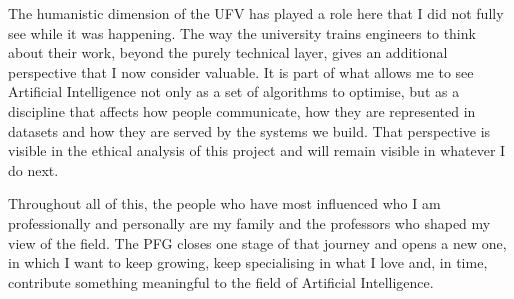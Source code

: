 The humanistic dimension of the UFV has played a role here that I did not fully see while it was
happening. The way the university trains engineers to think about their work, beyond the purely
technical layer, gives an additional perspective that I now consider valuable. It is part of what
allows me to see Artificial Intelligence not only as a set of algorithms to optimise, but as a
discipline that affects how people communicate, how they are represented in datasets and how they
are served by the systems we build. That perspective is visible in the ethical analysis of this
project and will remain visible in whatever I do next.

Throughout all of this, the people who have most influenced who I am professionally and personally
are my family and the professors who shaped my view of the field. The PFG closes one stage of that
journey and opens a new one, in which I want to keep growing, keep specialising in what I love and,
in time, contribute something meaningful to the field of Artificial Intelligence.